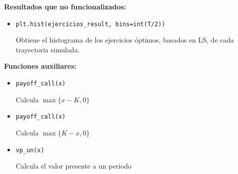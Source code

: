 \documentclass[11pt]{article}
\begin{document}
\noindent \textbf{Resultados que no funcionalizados:}\\

\begin{itemize}
\item \begin{verbatim}
plt.hist(ejercicios_result, bins=int(T/2))
\end{verbatim}
Obtiene el histograma de los ejercicios óptimos, basados en LS, de cada trayectoria simulada.
\end{itemize}

\noindent \textbf{Funciones auxiliares:}\\

\begin{itemize}
\item \begin{verbatim}
payoff_call(x)
\end{verbatim}
Calcula $\max\{x-K,0\}$

\item \begin{verbatim}
payoff_call(x)
\end{verbatim}
Calcula $\max\{K-x,0\}$

\item \begin{verbatim}
vp_un(x)
\end{verbatim}
Calcula el valor presente a un periodo
\end{itemize}
\end{document}
